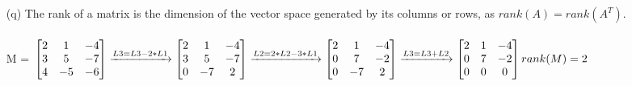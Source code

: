 \documentclass[a4paper]{article}
\begin{document}
\begin{itemize}
\item[(q)] The rank of a matrix is the dimension of the vector space generated by its columns or rows, as $rank(A)=rank(A^{T})$.\\\\
M = 
$
\begin{bmatrix} 
2 & 1 & -4\\
3 & 5 & -7\\
4 & -5 & -6
\end{bmatrix}
\xrightarrow{L3 = L3 - 2*L1}
\begin{bmatrix} 
2 & 1 & -4\\
3 & 5 & -7\\
0 & -7 & 2
\end{bmatrix}
\xrightarrow{L2 = 2*L2 - 3*L1}
\begin{bmatrix} 
2 & 1 & -4\\
0 & 7 & -2\\
0 & -7 & 2
\end{bmatrix}
\xrightarrow{L3 = L3 + L2}
\begin{bmatrix} 
2 & 1 & -4\\
0 & 7 & -2\\
0 & 0 & 0
\end{bmatrix}
\\\\
rank(M) = 2
$


\end{itemize}
\end{document}
